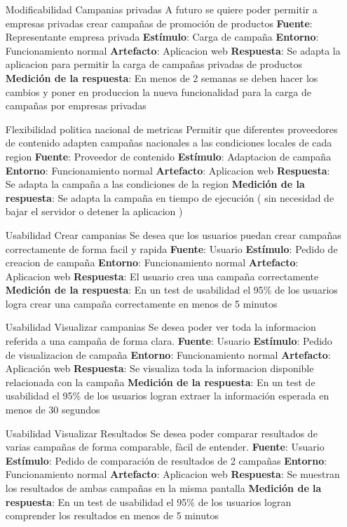 \documentclass[a4paper, 11pt]{article}
\begin{document}
\begin{itemize}
\item[Modificabilidad] Campanias privadas
A futuro se quiere poder permitir a empresas privadas crear campañas de promoción de productos
\textbf{Fuente}: Representante empresa privada
\textbf{Estímulo}: Carga de campaña
\textbf{Entorno}: Funcionamiento normal
\textbf{Artefacto}: Aplicacion web
\textbf{Respuesta}: Se adapta la aplicacion para permitir la carga de campañas privadas de productos
\textbf{Medición de la respuesta}: En menos de 2 semanas se deben hacer los cambios y poner en produccion la nueva funcionalidad para la carga de campañas por empresas privadas

\item[Flexibilidad] politica nacional de metricas
Permitir que diferentes proveedores de contenido adapten campañas nacionales a las condiciones locales de cada region
\textbf{Fuente}:  Proveedor de contenido
\textbf{Estímulo}: Adaptacion de campaña
\textbf{Entorno}: Funcionamiento normal
\textbf{Artefacto}: Aplicacion web
\textbf{Respuesta}: Se adapta la campaña a las condiciones de la region
\textbf{Medición de la respuesta}: Se adapta la campaña en tiempo de ejecución ( sin necesidad de bajar el servidor o detener la aplicacion )

\item[Usabilidad] Crear campanias
Se desea que los usuarios puedan crear campañas correctamente de forma facil y rapida
\textbf{Fuente}:  Usuario
\textbf{Estímulo}: Pedido de creacion de campaña
\textbf{Entorno}: Funcionamiento normal
\textbf{Artefacto}: Aplicacion web
\textbf{Respuesta}: El usuario crea una campaña correctamente
\textbf{Medición de la respuesta}: En un test de usabilidad el 95\% de los usuarios logra crear una campaña correctamente en menos de 5 minutos

\item[Usabilidad] Visualizar campanias
Se desea poder ver toda la informacion referida a una campaña de forma clara.
\textbf{Fuente}:  Usuario
\textbf{Estímulo}: Pedido de visualizacion de campaña
\textbf{Entorno}: Funcionamiento normal
\textbf{Artefacto}: Aplicación web
\textbf{Respuesta}: Se visualiza toda la informacion disponible relacionada con la campaña
\textbf{Medición de la respuesta}: En un test de usabilidad el 95\% de los usuarios logran extraer la información esperada en menos de 30 segundos

\item[Usabilidad] Visualizar Resultados
Se desea poder comparar resultados de varias campañas de forma comparable, fàcil de entender.
\textbf{Fuente}: Usuario
\textbf{Estímulo}: Pedido de comparación de resultados de 2 campañas
\textbf{Entorno}: Funcionamiento normal
\textbf{Artefacto}: Aplicacion web
\textbf{Respuesta}: Se muestran los resultados de ambas campañas en la misma pantalla
\textbf{Medición de la respuesta}: En un test de usabilidad el 95\% de los usuarios logran comprender los resultados en menos de 5 minutos

\end{itemize}
\end{document}
